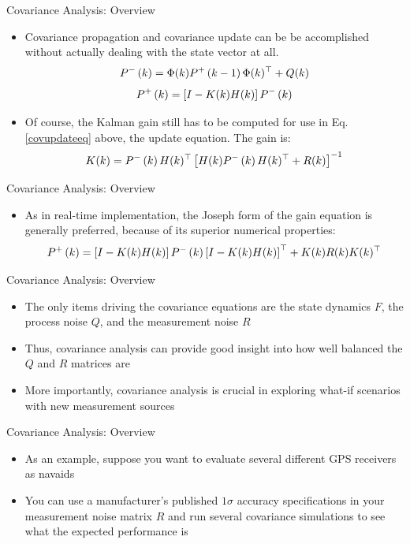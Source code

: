 \begin{frame}
Covariance Analysis: Overview
\begin{itemize}
  \item Covariance propagation and covariance update can be be accomplished without actually dealing with the state vector at all.
\begin{equation}\label{altcovextrapeq}
P^{-}\left( k \right)=\Phi(k)P^{+}\left( k-1 \right)\Phi(k)^\top + Q(k)
\end{equation}
\begin{equation}\label{covupdateeq}
  P^{+}\left( k \right)=\left[I-K(k)H(k)\right]P^{-}\left( k \right)
\end{equation}
  \item Of course, the Kalman gain still has to be computed for use in Eq. \eqref{covupdateeq} above, the update equation.  The gain is:
\begin{equation}\label{kalgaineq}
K(k)=P^{-}\left( k \right)H(k)^\top\left[H(k)P^{-}\left( k \right)H(k)^\top + R(k)\right]^{-1}
\end{equation}
\end{itemize} 
\end{frame}

\begin{frame}
Covariance Analysis: Overview
\begin{itemize}
  \item As in real-time implementation, the Joseph form of the gain equation is generally preferred, because of its superior numerical properties:
\begin{equation}
P^{+}\left( k \right)=\left[I-K(k)H(k)\right]P^{-}\left( k \right)\left[I-K(k)H(k)\right]^\top+K(k)R(k)K(k)^\top
\end{equation} 
\end{itemize} 
\end{frame}

\begin{frame}
Covariance Analysis: Overview
\begin{itemize}
  \item The only items driving the covariance equations are the state dynamics $F$, the process noise $Q$, and the measurement noise $R$
  \item Thus, covariance analysis can provide  good insight into how well balanced the $Q$ and $R$ matrices are
  \item More importantly, covariance analysis is crucial in exploring what-if scenarios with new measurement sources
\end{itemize} 
\end{frame}

\begin{frame}
Covariance Analysis: Overview
\begin{itemize}
  \item As an example, suppose you want to evaluate several different GPS receivers as navaids
  \item You can use a manufacturer's published $1\sigma$ accuracy specifications in your measurement noise matrix $R$ and run several covariance simulations to see what the expected performance is
\end{itemize} 
\end{frame}

